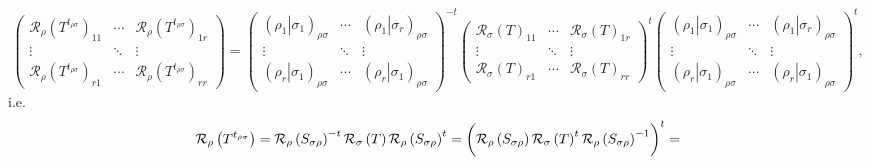 \documentclass[aps,preprint]{revtex4}
\begin{document}
\begin{equation}
\left( 
\begin{array}{ccc}
\mathcal{R}_{\rho }\left( T^{t_{\rho \sigma }}\right) _{11} & \cdots & 
\mathcal{R}_{\rho }\left( T^{t_{\rho \sigma }}\right) _{1r} \\ 
\vdots & \ddots & \vdots \\ 
\mathcal{R}_{\rho }\left( T^{t_{\rho \sigma }}\right) _{r1} & \cdots & 
\mathcal{R}_{\rho }\left( T^{t_{\rho \sigma }}\right) _{rr}%
\end{array}%
\right) =\left( 
\begin{array}{ccc}
\left( \left. \rho _{1}\right\vert \sigma _{1}\right) _{\rho \sigma } & 
\cdots & \left( \left. \rho _{1}\right\vert \sigma _{r}\right) _{\rho \sigma
} \\ 
\vdots & \ddots & \vdots \\ 
\left( \left. \rho _{r}\right\vert \sigma _{1}\right) _{\rho \sigma } & 
\cdots & \left( \left. \rho _{r}\right\vert \sigma _{1}\right) _{\rho \sigma
}%
\end{array}%
\right) ^{-t}\left( 
\begin{array}{ccc}
\mathcal{R}_{\sigma }\left( T\right) _{11} & \cdots & \mathcal{R}_{\sigma
}\left( T\right) _{1r} \\ 
\vdots & \ddots & \vdots \\ 
\mathcal{R}_{\sigma }\left( T\right) _{r1} & \cdots & \mathcal{R}_{\sigma
}\left( T\right) _{rr}%
\end{array}%
\right) ^{t}\left( 
\begin{array}{ccc}
\left( \left. \rho _{1}\right\vert \sigma _{1}\right) _{\rho \sigma } & 
\cdots & \left( \left. \rho _{1}\right\vert \sigma _{r}\right) _{\rho \sigma
} \\ 
\vdots & \ddots & \vdots \\ 
\left( \left. \rho _{r}\right\vert \sigma _{1}\right) _{\rho \sigma } & 
\cdots & \left( \left. \rho _{r}\right\vert \sigma _{1}\right) _{\rho \sigma
}%
\end{array}%
\right) ^{t},
\end{equation}%
i.e. 
\begin{equation}
\mathcal{R}_{\rho }\left( T^{t_{\rho \sigma }}\right) =\mathcal{R}_{\rho
}\left( S_{\sigma \rho }\right) ^{-t}\mathcal{R}_{\sigma }\left( T\right) 
\mathcal{R}_{\rho }\left( S_{\sigma \rho }\right) ^{t}=\left( \overset{}{%
\mathcal{R}_{\rho }\left( S_{\sigma \rho }\right) \mathcal{R}_{\sigma
}\left( T\right) ^{t}\mathcal{R}_{\rho }\left( S_{\sigma \rho }\right) ^{-1}}%
\right) ^{t}=
\end{equation}
\end{document}
